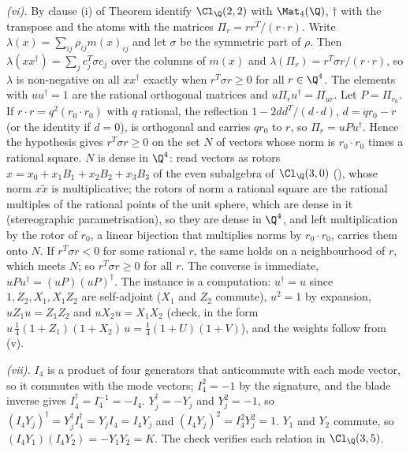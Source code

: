 \emph{(vi).} By clause (i) of Theorem  identify $\Cl_{\Q}(2,2)$ with $\Mat_{4}(\Q)$, $\dagger$ with the transpose and the atoms with the matrices $\Pi_{r} = rr^{T}/(r \cdot r)$. Write $\lambda(x) = \sum_{ij}\rho_{ij}m(x)_{ij}$ and let $\sigma$ be the symmetric part of $\rho$. Then $\lambda(xx^{\dagger}) = \sum_{j}c_{j}^{T}\sigma c_{j}$ over the columns of $m(x)$ and $\lambda(\Pi_{r}) = r^{T}\sigma r/(r \cdot r)$, so $\lambda$ is non-negative on all $xx^{\dagger}$ exactly when $r^{T}\sigma r \ge 0$ for all $r \in \Q^{4}$. The elements with $uu^{\dagger} = 1$ are the rational orthogonal matrices and $u\Pi_{r}u^{\dagger} = \Pi_{ur}$. Let $P = \Pi_{r_{0}}$. If $r \cdot r = q^{2}(r_{0} \cdot r_{0})$ with $q$ rational, the reflection $1 - 2dd^{T}/(d \cdot d)$, $d = qr_{0} - r$ (or the identity if $d = 0$), is orthogonal and carries $qr_{0}$ to $r$, so $\Pi_{r} = uPu^{\dagger}$. Hence the hypothesis gives $r^{T}\sigma r \ge 0$ on the set $N$ of vectors whose norm is $r_{0} \cdot r_{0}$ times a rational square. $N$ is dense in $\Q^{4}$: read vectors as rotors $x = x_{0} + x_{1}B_{1} + x_{2}B_{2} + x_{3}B_{3}$ of the even subalgebra of $\Cl_{\Q}(3,0)$ (), whose norm $x\tilde{x}$ is multiplicative; the rotors of norm a rational square are the rational multiples of the rational points of the unit sphere, which are dense in it (stereographic parametrisation), so they are dense in $\Q^{4}$, and left multiplication by the rotor of $r_{0}$, a linear bijection that multiplies norms by $r_{0} \cdot r_{0}$, carries them onto $N$. If $r^{T}\sigma r < 0$ for some rational $r$, the same holds on a neighbourhood of $r$, which meets $N$; so $r^{T}\sigma r \ge 0$ for all $r$. The converse is immediate, $uPu^{\dagger} = (uP)(uP)^{\dagger}$. The instance is a computation: $u^{\dagger} = u$ since $1, Z_{2}, X_{1}, X_{1}Z_{2}$ are self-adjoint ($X_{1}$ and $Z_{2}$ commute), $u^{2} = 1$ by expansion, $uZ_{1}u = Z_{1}Z_{2}$ and $uX_{2}u = X_{1}X_{2}$ (check, in the form $u\,\tfrac14(1 + Z_{1})(1 + X_{2})\,u = \tfrac14(1 + U)(1 + V)$), and the weights follow from (v).

\emph{(vii).} $I_{4}$ is a product of four generators that anticommute with each mode vector, so it commutes with the mode vectors; $I_{4}^{2} = -1$ by the signature, and the blade inverse gives $I_{4}^{\dagger} = I_{4}^{-1} = -I_{4}$. $Y_{j}^{\dagger} = -Y_{j}$ and $Y_{j}^{2} = -1$, so $(I_{4}Y_{j})^{\dagger} = Y_{j}^{\dagger}I_{4}^{\dagger} = Y_{j}I_{4} = I_{4}Y_{j}$ and $(I_{4}Y_{j})^{2} = I_{4}^{2}Y_{j}^{2} = 1$. $Y_{1}$ and $Y_{2}$ commute, so $(I_{4}Y_{1})(I_{4}Y_{2}) = -Y_{1}Y_{2} = K$. The check verifies each relation in $\Cl_{\Q}(3,5)$.
